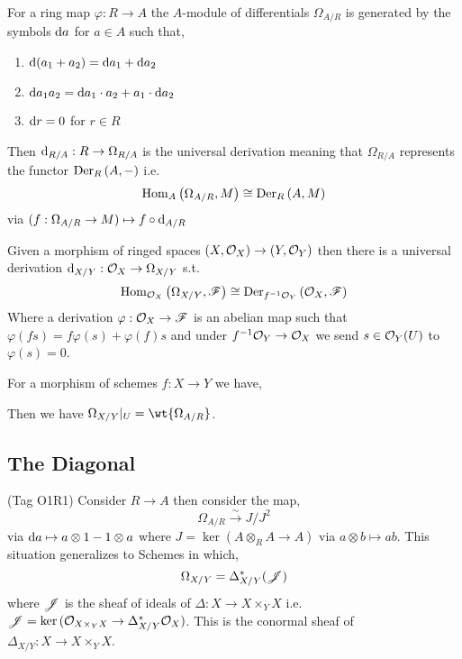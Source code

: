 \documentclass[12pt]{article}
\begin{document}
\begin{defn}
For a ring map $\varphi : R \to A$ the $A$-module of differentials $\Omega_{A/R}$ is generated by the symbols $\mathrm{d}{a}$ for $a \in A$ such that,
\begin{enumerate}
\item $\mathrm{d}{(a_1 + a_2)} = \mathrm{d}{a_1} + \mathrm{d}{a_2}$
\item $\mathrm{d}{a_1 a_2} = \mathrm{d}{a_1} \cdot a_2 + a_1 \cdot \mathrm{d}{a_2}$
\item $\mathrm{d}{r} = 0$ for $r \in R$
\end{enumerate}
Then $\mathrm{d}_{R/A} : R \to \Omega_{R/A}$ is the universal derivation meaning that $\Omega_{R/A}$ represents the functor $\mathrm{Der}_{R} \left( A, - \right)$ i.e.
\[ \mathrm{Hom}_{A} \left( \Omega_{A/R}, M \right) \cong \mathrm{Der}_{R} \left( A, M \right) \]
via $(f : \Omega_{A/R} \to M) \mapsto f \circ \mathrm{d}_{A/R}$
\end{defn}

\begin{defn}
Given a morphism of ringed spaces $(X, \mathcal{O}_{X}) \to (Y, \mathcal{O}_{Y})$
then there is a universal derivation $\mathrm{d}_{X/Y} : \mathcal{O}_{X} \to \Omega_{X/Y}$ s.t.
\[ \mathrm{Hom}_{\mathcal{O}_{X}} \left( \Omega_{X/Y}, \mathscr{F} \right) \cong \mathrm{Der}_{f^{-1} \mathcal{O}_{Y}} \left( \mathcal{O}_{X}, \mathscr{F} \right) \]
Where a derivation $\varphi : \mathcal{O}_{X} \to \mathscr{F}$ is an abelian map such that $\varphi(fs) = f \varphi(s) + \varphi(f) s$ and under $f^{-1} \mathcal{O}_{Y} \to \mathcal{O}_{X}$ we send $s \in \mathcal{O}_{Y}(U)$ to $\varphi(s) = 0$.
\end{defn}

\begin{lemma}
For a morphism of schemes $f : X \to Y$ we have,
\begin{center}
\end{center}
Then we have $\Omega_{X/Y} |_U = \wt{\Omega_{A/R}}$. 
\end{lemma}

\subsection{The Diagonal}
(Tag O1R1)
Consider $R \to A$ then consider the map,
\[ \Omega_{A/R} \xrightarrow{\sim} J / J^2 \]
via $\mathrm{d}{a} \mapsto a \otimes 1 - 1 \otimes a$ where $J = \ker{(A \otimes_R A \to A)}$ via $a \otimes b \mapsto ab$. This situation generalizes to Schemes in which,
\[ \Omega_{X/Y} = \Delta_{X/Y}^*(\mathscr{J}) \]
where $\mathscr{J}$ is the sheaf of ideals of $\Delta : X \to X \times_Y X$ i.e. $\mathscr{J} = \ker{(\mathcal{O}_{X \times_Y X} \to \Delta_{X/Y}^* \mathcal{O}_{X})}$. This is the conormal sheaf of $\Delta_{X/Y} : X \to X \times_Y X$. 
\end{document}
